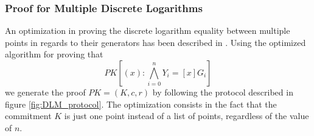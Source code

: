 \clearpage
\subsubsection{Proof for Multiple Discrete Logarithms}
An optimization in proving the discrete logarithm equality between multiple points in regards to their generators has been described in \cite{Chow10}. Using the optimized algorithm for proving that
\[
PK[(x) : \bigwedge_{i=0}^{n} Y_i = [x]G_i]
\]
we generate the proof \( PK = (K, c, r) \) by following the protocol described in figure \ref{fig:DLM_protocol}. The optimization consists in the fact that the commitment $K$ is just one point instead of a list of points, regardless of the value of $n$.


